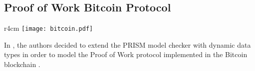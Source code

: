 \begin{comment}
module PC
   PC : [0..7] init 0;
	
   [DPPGR] (PC=0)  $\rightarrow$ 1 :  (PC'=1); 
   [YCJJG] (PC=1)  $\rightarrow$ 1 :  (PC'=2); 
   [TWGVA] (PC=2)  $\rightarrow$ 1 :  (PC'=3); 
   [NODPZ] (PC=3)  $\rightarrow$ 1 :  (PC'=4); 
   [FDALJ] (PC=4)  $\rightarrow$ 1 :  (PC'=5); 
   [DCKXC] (PC=5)  $\rightarrow$ 1 :  (PC'=6); 
endmodule

module M1
   M1 : [0..1] init 0;
   varM1 : bool; 

   [DPPGR] (M1=0)  $\rightarrow$ p :(varM1'=true)$\&$(M1'=0) + (1-p) :(varM1'=false)$\&$(M1'=0); 
endmodule	

$\ldots$

module P1
   P1 : [0..3] init 0;
   varP1 : bool; 

   [NODPZ] (P1=0)  $\rightarrow$ p:(varP1'=true)$\&$(P1'=0) + (1-p):(varP1'=false)$\&$(P1'=0); 
   [] (P1=0)$\&$(PC=6)$\&$!varP1&((varP1 $\&$ varM1) | (varM2$\&$ varP3))  
   				$\rightarrow$ 1 : (varP1'=true)$\&$(P1'=0); 
endmodule
$\ldots$
\end{lstlisting}

The model is very similar to the one presented in the PRISM repository, the main difference is that we use state variables also for the modules \texttt{P$_i$} and \texttt{M$_i$}, 
where in the original model they were not requires.
However, this does not affect the behaviour of the model, as the reader can notice from the results of the probability that nodes 1 and 2 are connected showed in Figure \ref{ex4-res}.
\begin{figure}[h]
\centering
\texttt{[image: example5-results.jpeg]}	
\caption{Probability that the nodes 1 and 2 are connected.}
\label{ex4-res}
\end{figure}
\newpage
\end{comment}
\subsection{Proof of Work Bitcoin Protocol}
\begin{wrapfigure}[7]{r}{4cm}
	\texttt{[image: bitcoin.pdf]}	
\end{wrapfigure} 
In \cite{DBLP:journals/concurrency/BistarelliNGLMV23}, the authors decided to extend the PRISM model checker with
dynamic data types in order to model the Proof of Work protocol implemented in the Bitcoin blockchain \cite{bitcoin}.

